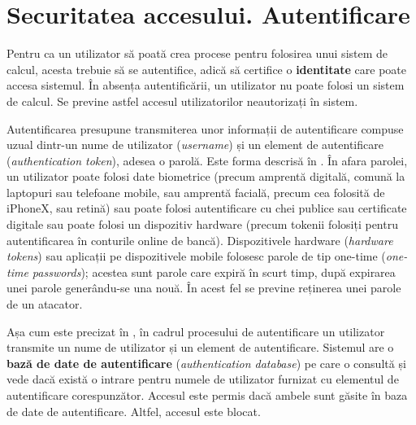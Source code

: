 
\section{Securitatea accesului. Autentificare}
\label{sec:sec:auth}

Pentru ca un utilizator să poată crea procese pentru folosirea unui sistem de calcul, acesta trebuie să se autentifice, adică să certifice o \textbf{identitate} care poate accesa sistemul. În absența autentificării, un utilizator nu poate folosi un sistem de calcul. Se previne astfel accesul utilizatorilor neautorizați în sistem.

Autentificarea presupune transmiterea unor informații de autentificare compuse uzual dintr-un nume de utilizator (\textit{username}) și un element de autentificare (\textit{authentication token}), adesea o parolă. Este forma descrisă în . În afara parolei, un utilizator poate folosi date biometrice (precum amprentă digitală, comună la laptopuri sau telefoane mobile, sau amprentă facială, precum cea folosită de iPhoneX, sau retină) sau poate folosi autentificare cu chei publice sau certificate digitale sau poate folosi un dispozitiv hardware (precum tokenii folosiți pentru autentificarea în conturile online de bancă). Dispozitivele hardware (\textit{hardware tokens}) sau aplicații pe dispozitivele mobile folosesc parole de tip one-time (\textit{one-time passwords}); acestea sunt parole care expiră în scurt timp, după expirarea unei parole generându-se una nouă. În acest fel se previne reținerea unei parole de un atacator.

Așa cum este precizat în , în cadrul procesului de autentificare un utilizator transmite un nume de utilizator și un element de autentificare. Sistemul are o \textbf{bază de date de autentificare} (\textit{authentication database}) pe care o consultă și vede dacă există o intrare pentru numele de utilizator furnizat cu elementul de autentificare corespunzător. Accesul este permis dacă ambele sunt găsite în baza de date de autentificare. Altfel, accesul este blocat.


